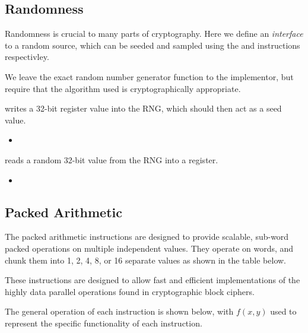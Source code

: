 \subsection{Randomness}

Randomness is crucial to many parts of cryptography. Here we define an 
{\em interface} to a random source, which can be seeded and sampled using
the  and  instructions respectivley.

We leave the exact random number generator function to the implementor,
but require that the algorithm used is cryptographically appropriate.

\ienc{\iencrseedcr}

 writes a 32-bit register value into the RNG, which should
then act as a seed value.

\begin{itemize}
\item {}
\end{itemize}

\ienc{\iencrsampcr}

 reads a random 32-bit value from the RNG into a register.

\begin{itemize}
\item {}
\end{itemize}

\subsection{Packed Arithmetic}

The packed arithmetic instructions are designed to provide scalable, sub-word
packed operations on multiple independent values. They operate on words, and
chunk them into 1, 2, 4, 8, or 16 separate values as shown in the table
below.

These instructions are designed to allow fast and efficient implementations
of the highly data parallel operations found in cryptographic block ciphers.

The general operation of each instruction is shown below, with $f(x,y)$
used to represent the specific functionality of each instruction.

\medskip

